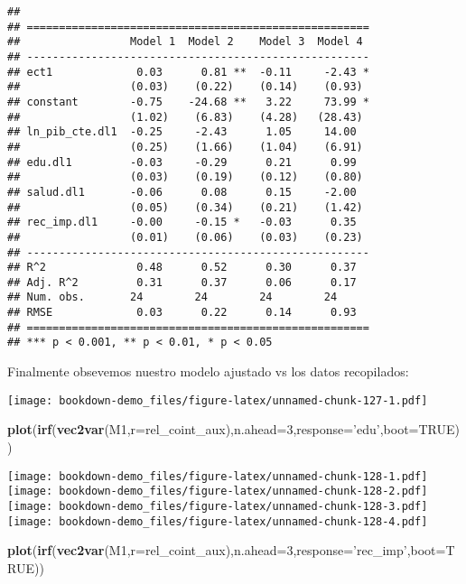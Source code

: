 \documentclass[]{book}
\newenvironment{Shaded}{\begin{snugshade}}{\end{snugshade}}
\newcommand{\KeywordTok}[1]{\textcolor[rgb]{0.13,0.29,0.53}{\textbf{#1}}}
\newcommand{\DataTypeTok}[1]{\textcolor[rgb]{0.13,0.29,0.53}{#1}}
\newcommand{\DecValTok}[1]{\textcolor[rgb]{0.00,0.00,0.81}{#1}}
\newcommand{\StringTok}[1]{\textcolor[rgb]{0.31,0.60,0.02}{#1}}
\newcommand{\OtherTok}[1]{\textcolor[rgb]{0.56,0.35,0.01}{#1}}
\newcommand{\NormalTok}[1]{#1}
\theoremstyle{definition}
\theoremstyle{definition}
\theoremstyle{definition}
\theoremstyle{remark}
\begin{document}
\begin{verbatim}
## 
## =====================================================
##                 Model 1  Model 2    Model 3  Model 4 
## -----------------------------------------------------
## ect1             0.03      0.81 **  -0.11     -2.43 *
##                 (0.03)    (0.22)    (0.14)    (0.93) 
## constant        -0.75    -24.68 **   3.22     73.99 *
##                 (1.02)    (6.83)    (4.28)   (28.43) 
## ln_pib_cte.dl1  -0.25     -2.43      1.05     14.00  
##                 (0.25)    (1.66)    (1.04)    (6.91) 
## edu.dl1         -0.03     -0.29      0.21      0.99  
##                 (0.03)    (0.19)    (0.12)    (0.80) 
## salud.dl1       -0.06      0.08      0.15     -2.00  
##                 (0.05)    (0.34)    (0.21)    (1.42) 
## rec_imp.dl1     -0.00     -0.15 *   -0.03      0.35  
##                 (0.01)    (0.06)    (0.03)    (0.23) 
## -----------------------------------------------------
## R^2              0.48      0.52      0.30      0.37  
## Adj. R^2         0.31      0.37      0.06      0.17  
## Num. obs.       24        24        24        24     
## RMSE             0.03      0.22      0.14      0.93  
## =====================================================
## *** p < 0.001, ** p < 0.01, * p < 0.05
\end{verbatim}

Finalmente obsevemos nuestro modelo ajustado vs los datos recopilados:

\texttt{[image: bookdown-demo\_files/figure-latex/unnamed-chunk-127-1.pdf]}

\begin{Shaded}
\begin{Highlighting}[]
\KeywordTok{plot}\NormalTok{(}\KeywordTok{irf}\NormalTok{(}\KeywordTok{vec2var}\NormalTok{(M1,}\DataTypeTok{r=}\NormalTok{rel_coint_aux),}\DataTypeTok{n.ahead=}\DecValTok{3}\NormalTok{,}\DataTypeTok{response=}\StringTok{'edu'}\NormalTok{,}\DataTypeTok{boot=}\OtherTok{TRUE}\NormalTok{))}
\end{Highlighting}
\end{Shaded}

\texttt{[image: bookdown-demo\_files/figure-latex/unnamed-chunk-128-1.pdf]}
\texttt{[image: bookdown-demo\_files/figure-latex/unnamed-chunk-128-2.pdf]}
\texttt{[image: bookdown-demo\_files/figure-latex/unnamed-chunk-128-3.pdf]}
\texttt{[image: bookdown-demo\_files/figure-latex/unnamed-chunk-128-4.pdf]}

\begin{Shaded}
\begin{Highlighting}[]
\KeywordTok{plot}\NormalTok{(}\KeywordTok{irf}\NormalTok{(}\KeywordTok{vec2var}\NormalTok{(M1,}\DataTypeTok{r=}\NormalTok{rel_coint_aux),}\DataTypeTok{n.ahead=}\DecValTok{3}\NormalTok{,}\DataTypeTok{response=}\StringTok{'rec_imp'}\NormalTok{,}\DataTypeTok{boot=}\OtherTok{TRUE}\NormalTok{))}
\end{Highlighting}
\end{Shaded}
\end{document}
